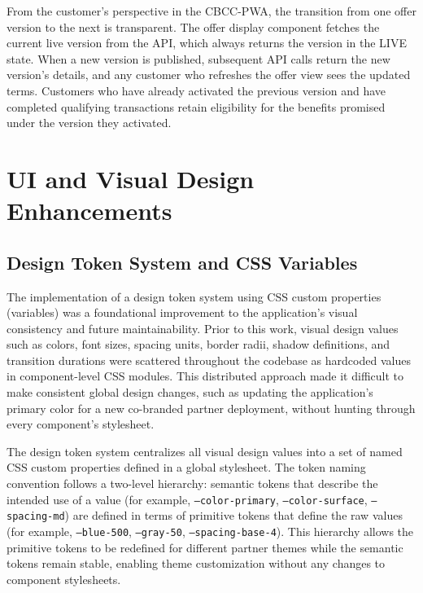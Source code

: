 From the customer's perspective in the CBCC-PWA, the transition from one offer version to the next is transparent. The offer display component fetches the current live version from the API, which always returns the version in the LIVE state. When a new version is published, subsequent API calls return the new version's details, and any customer who refreshes the offer view sees the updated terms. Customers who have already activated the previous version and have completed qualifying transactions retain eligibility for the benefits promised under the version they activated.

\section{UI and Visual Design Enhancements}

\subsection{Design Token System and CSS Variables}

The implementation of a design token system using CSS custom properties (variables) was a foundational improvement to the application's visual consistency and future maintainability. Prior to this work, visual design values such as colors, font sizes, spacing units, border radii, shadow definitions, and transition durations were scattered throughout the codebase as hardcoded values in component-level CSS modules. This distributed approach made it difficult to make consistent global design changes, such as updating the application's primary color for a new co-branded partner deployment, without hunting through every component's stylesheet.

The design token system centralizes all visual design values into a set of named CSS custom properties defined in a global stylesheet. The token naming convention follows a two-level hierarchy: semantic tokens that describe the intended use of a value (for example, \texttt{--color-primary}, \texttt{--color-surface}, \texttt{--spacing-md}) are defined in terms of primitive tokens that define the raw values (for example, \texttt{--blue-500}, \texttt{--gray-50}, \texttt{--spacing-base-4}). This hierarchy allows the primitive tokens to be redefined for different partner themes while the semantic tokens remain stable, enabling theme customization without any changes to component stylesheets.

